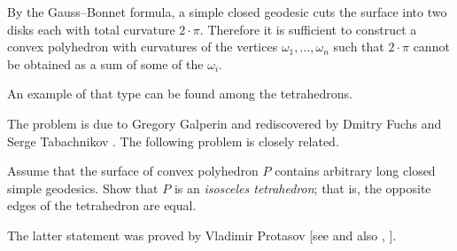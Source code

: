 By the Gauss--Bonnet formula, a simple closed geodesic cuts the surface into two disks each with total curvature $2\cdot\pi$.
Therefore it is sufficient to construct a convex polyhedron with curvatures of the vertices $\omega_1,\dots,\omega_n$ such that
$2\cdot\pi$ cannot be obtained as a sum of some of the $\omega_i$.

An example of that type can be found among the tetrahedrons.
\qeds

The problem is due to Gregory Galperin \cite{galperin} 
and rediscovered by Dmitry Fuchs and Serge Tabachnikov \cite[see 20.8 in][]{fuchs-tabachnikov}.
The following problem is closely related.

\begin{pr}
Assume that the surface of convex polyhedron $P$ contains arbitrary long closed simple geodesics. 
Show that $P$ is an \emph{isosceles tetrahedron};
that is, the opposite edges of the tetrahedron are equal.
\end{pr}

The latter statement was proved by Vladimir Protasov [see  and also , ].

